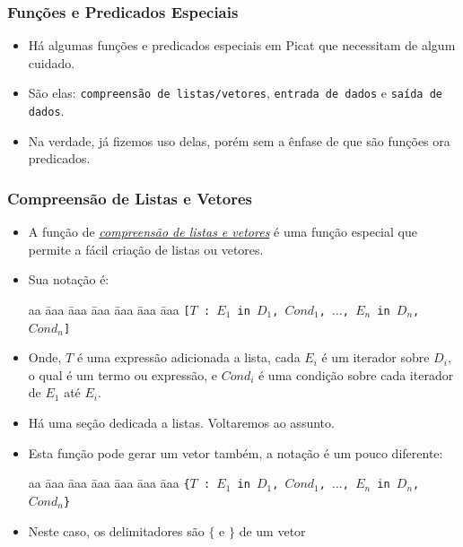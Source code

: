 \begin{frame}[fragile]

\frametitle{Funções e Predicados Especiais}
\begin{itemize}
    
    \item Há algumas funções e predicados especiais em Picat 
    que necessitam de algum cuidado.
    
    \pause
    \item São elas: \texttt{compreensão de listas/vetores}, 
    \texttt{entrada de dados} e \texttt{saída de dados}.
    
    \item Na verdade, já fizemos uso delas, porém sem a ênfase de que
    são funções ora predicados.
    
\end{itemize}
\end{frame}      


\begin{frame}[c,allowframebreaks]

\frametitle{Compreensão de Listas e Vetores}    
    
\begin{itemize}    
    \item A função de \underline{\textit{compreensão de listas e vetores}} é uma 
    função especial que  permite a fácil criação de listas ou vetores.
    
    \item Sua notação é:
    
    \begin{tabbing}
        aa \= aaa \= aaa \= aaa \= aaa \= aaa \= aaa \kill
        \> \> \texttt{[$T$ : $E_1$ \texttt{in} $D_1$, $Cond_1$, $\ldots$, $E_n$ in $D_n$, $Cond_n$]} 
    \end{tabbing}
    
    \item Onde, $T$ é uma expressão  adicionada a lista, cada $E_i$ é um 
    iterador sobre $D_i$, o qual é um termo ou expressão, 
     e $Cond_i$ é uma condição sobre cada iterador de $E_1$ até $E_i$.
    
    \item Há uma seção dedicada a listas. Voltaremos ao assunto.
    
    \framebreak

    \item Esta função pode gerar um vetor também, a notação é um pouco diferente:
    
    \begin{tabbing}
        aa \= aaa \= aaa \= aaa \= aaa \= aaa \= aaa \kill
        \> \> \texttt{\{$T$ : $E_1$ \texttt{in} $D_1$, $Cond_1$, $\ldots$, $E_n$ in $D_n$, $Cond_n$\}} 
    \end{tabbing}
    
    \item Neste caso, os delimitadores são $\{$ e $\}$ de um vetor

\end{itemize}

\end{frame}      

